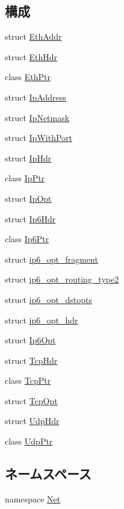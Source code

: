 \subsection*{構成}
\begin{DoxyCompactItemize}
\item 
struct \hyperlink{structNet_1_1EthAddr}{EthAddr}
\item 
struct \hyperlink{structNet_1_1EthHdr}{EthHdr}
\item 
class \hyperlink{classNet_1_1EthPtr}{EthPtr}
\item 
struct \hyperlink{structNet_1_1IpAddress}{IpAddress}
\item 
struct \hyperlink{structNet_1_1IpNetmask}{IpNetmask}
\item 
struct \hyperlink{structNet_1_1IpWithPort}{IpWithPort}
\item 
struct \hyperlink{structNet_1_1IpHdr}{IpHdr}
\item 
class \hyperlink{classNet_1_1IpPtr}{IpPtr}
\item 
struct \hyperlink{structNet_1_1IpOpt}{IpOpt}
\item 
struct \hyperlink{structNet_1_1Ip6Hdr}{Ip6Hdr}
\item 
class \hyperlink{classNet_1_1Ip6Ptr}{Ip6Ptr}
\item 
struct \hyperlink{structNet_1_1ip6__opt__fragment}{ip6\_\-opt\_\-fragment}
\item 
struct \hyperlink{structNet_1_1ip6__opt__routing__type2}{ip6\_\-opt\_\-routing\_\-type2}
\item 
struct \hyperlink{structNet_1_1ip6__opt__dstopts}{ip6\_\-opt\_\-dstopts}
\item 
struct \hyperlink{structNet_1_1ip6__opt__hdr}{ip6\_\-opt\_\-hdr}
\item 
struct \hyperlink{structNet_1_1Ip6Opt}{Ip6Opt}
\item 
struct \hyperlink{structNet_1_1TcpHdr}{TcpHdr}
\item 
class \hyperlink{classNet_1_1TcpPtr}{TcpPtr}
\item 
struct \hyperlink{structNet_1_1TcpOpt}{TcpOpt}
\item 
struct \hyperlink{structNet_1_1UdpHdr}{UdpHdr}
\item 
class \hyperlink{classNet_1_1UdpPtr}{UdpPtr}
\end{DoxyCompactItemize}
\subsection*{ネームスペース}
\begin{DoxyCompactItemize}
\item 
namespace \hyperlink{namespaceNet}{Net}
\end{DoxyCompactItemize}
